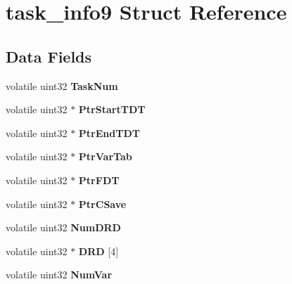 \hypertarget{structtask__info9}{}\section{task\+\_\+info9 Struct Reference}
\label{structtask__info9}
\subsection*{Data Fields}
\begin{DoxyCompactItemize}
\item 
\mbox{\label{structtask__info9_a6f09c994c04c428ed42fafc3e8acb556}} 
volatile uint32 {\bfseries Task\+Num}
\item 
\mbox{\label{structtask__info9_a1fcfeaa28c737b3e67d5788b007146fd}} 
volatile uint32 $\ast$ {\bfseries Ptr\+Start\+T\+DT}
\item 
\mbox{\label{structtask__info9_ada766d5b68c000abfee050b902ae60a9}} 
volatile uint32 $\ast$ {\bfseries Ptr\+End\+T\+DT}
\item 
\mbox{\label{structtask__info9_a2db1bd0731541d27aea6f8c1ad603608}} 
volatile uint32 $\ast$ {\bfseries Ptr\+Var\+Tab}
\item 
\mbox{\label{structtask__info9_a009ccbdc47990eca73022f3052446cd1}} 
volatile uint32 $\ast$ {\bfseries Ptr\+F\+DT}
\item 
\mbox{\label{structtask__info9_a8d2bd4a54fccfa61e2a748257bf9a92e}} 
volatile uint32 $\ast$ {\bfseries Ptr\+C\+Save}
\item 
\mbox{\label{structtask__info9_aa4bb863d61a1a79378fadd1c02468380}} 
volatile uint32 {\bfseries Num\+D\+RD}
\item 
\mbox{\label{structtask__info9_a4db5be3e35d0cea1064dd2a854095e4d}} 
volatile uint32 $\ast$ {\bfseries D\+RD} \mbox{[}4\mbox{]}
\item 
\mbox{\label{structtask__info9_a35baaa59441fe84b7554391bf25b7225}} 
volatile uint32 {\bfseries Num\+Var}
\item 

\end{DoxyCompactItemize}
